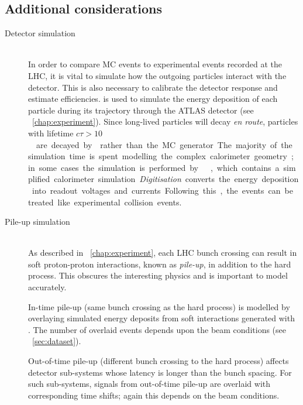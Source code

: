 \subsection{Additional considerations}
\label{sec:mc:other}

\begin{description}
\item[Detector simulation] \hfill \\
	In order to compare MC events to experimental events recorded at the LHC, 
	it is vital to simulate how the outgoing particles interact with the detector. This 
	is also necessary to calibrate the detector response and estimate efficiencies. 
	\geant \cite{GEANT4,ATLAS-simulation} is used to simulate the energy deposition of 
	each particle during its trajectory through the ATLAS detector (see 
	\Chapter~\ref{chap:experiment}). Since long-lived particles will decay \textit{en 
	route}, particles with lifetime \unit{$c\tau > 10$}{\milli\metre} are decayed by 
	\geant rather than the MC generator. The majority of the simulation time is 
	spent modelling the complex calorimeter geometry; in some cases the simulation is 
	performed by \atlfast \cite{Atlfast}, which contains a simplified calorimeter 
	simulation.

	\textit{Digitisation} converts the energy deposition into readout voltages and 
	currents. Following this, the events can be treated like experimental collision 
	events.
\item[Pile-up simulation] \hfill \\
	As described in \Chapter~\ref{chap:experiment}, each LHC bunch crossing can 
	result in soft proton-proton interactions, known as \textit{pile-up}, in addition to 
	the hard process. This obscures the interesting physics and is important to model 
	accurately.

	In-time pile-up (same bunch crossing as the hard process) is modelled by overlaying 
	simulated energy deposits from soft \pp interactions generated with . The 
	number of overlaid events depends upon the beam conditions (see 
	\Section~\ref{sec:dataset}).

	Out-of-time pile-up (different bunch crossing to the hard process) affects detector 
	sub-systems whose latency is longer than the bunch spacing. For such sub-systems, 
	signals from out-of-time pile-up are overlaid with corresponding time shifts; again 
	this depends on the beam conditions.
\end{description}
